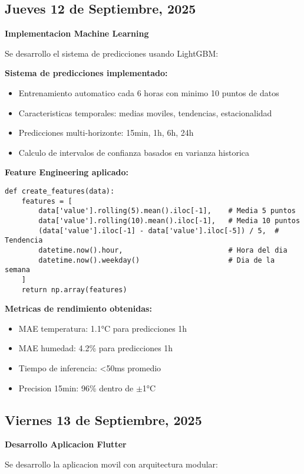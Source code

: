 \documentclass[11pt,letterpaper]{article}
\begin{document}
\subsection{Jueves 12 de Septiembre, 2025}
\textbf{Implementacion Machine Learning}

Se desarrollo el sistema de predicciones usando LightGBM:

\textbf{Sistema de predicciones implementado:}
\begin{itemize}
    \item Entrenamiento automatico cada 6 horas con minimo 10 puntos de datos
    \item Caracteristicas temporales: medias moviles, tendencias, estacionalidad
    \item Predicciones multi-horizonte: 15min, 1h, 6h, 24h
    \item Calculo de intervalos de confianza basados en varianza historica
\end{itemize}

\textbf{Feature Engineering aplicado:}
\begin{verbatim}
def create_features(data):
    features = [
        data['value'].rolling(5).mean().iloc[-1],    # Media 5 puntos
        data['value'].rolling(10).mean().iloc[-1],   # Media 10 puntos
        (data['value'].iloc[-1] - data['value'].iloc[-5]) / 5,  # Tendencia
        datetime.now().hour,                         # Hora del dia
        datetime.now().weekday()                     # Dia de la semana
    ]
    return np.array(features)
\end{verbatim}

\textbf{Metricas de rendimiento obtenidas:}
\begin{itemize}
    \item MAE temperatura: 1.1°C para predicciones 1h
    \item MAE humedad: 4.2\% para predicciones 1h
    \item Tiempo de inferencia: <50ms promedio
    \item Precision 15min: 96\% dentro de $\pm$1°C
\end{itemize}

\subsection{Viernes 13 de Septiembre, 2025}
\textbf{Desarrollo Aplicacion Flutter}

Se desarrollo la aplicacion movil con arquitectura modular:
\end{document}
